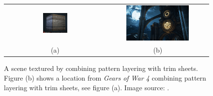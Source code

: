 \begin{figure}
	\centering\small 
	\begin{tabular}{@{}cc@{}}
		\includegraphics[width=0.25\textwidth]{images/07cha_24_clinton-crumpler-crumpler-51-copy.jpg} &
		\includegraphics[width=0.65\textwidth]{images/07cha_24_clinton-crumpler-highresscreenshot00023-min.jpg} \\	
		(a) & (b)
	\end{tabular}
	
	\caption{A scene textured by combining pattern layering with trim sheets. 
		Figure (b)  shows a location from \emph{Gears of War 4} combining pattern layering with trim sheets, see figure (a). Image source: \cite{crumpler2016Gears}.}
	\label{fig:GearsTrimPattern}
\end{figure}



